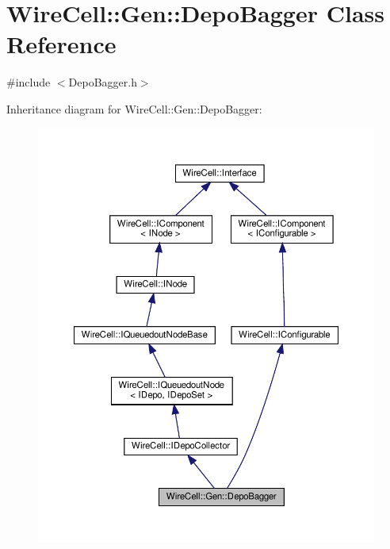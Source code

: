 \hypertarget{class_wire_cell_1_1_gen_1_1_depo_bagger}{}\section{Wire\+Cell\+:\+:Gen\+:\+:Depo\+Bagger Class Reference}
\label{class_wire_cell_1_1_gen_1_1_depo_bagger}


{\ttfamily \#include $<$Depo\+Bagger.\+h$>$}



Inheritance diagram for Wire\+Cell\+:\+:Gen\+:\+:Depo\+Bagger\+:
\nopagebreak
\begin{figure}[H]
\begin{center}
\leavevmode
\includegraphics[width=350pt]{class_wire_cell_1_1_gen_1_1_depo_bagger__inherit__graph}
\end{center}
\end{figure}


